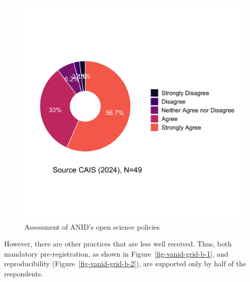 \documentclass[
  letterpaper,
  DIV=11,
  numbers=noendperiod]{scrartcl}
\begin{document}
\begin{figure}
\begin{minipage}[t]{0.50\linewidth}
{{\includegraphics{paper_files/figure-pdf/fig-vanid-grid-2.png}

}

}

\end{minipage}%

\caption{\label{fig-vanid-grid}Assessment of ANID's open science
policies}

\end{figure}

However, there are other practices that are less well received. Thus,
both mandatory pre-registration, as shown in
Figure~\ref{fig-vanid-grid-b-1}, and reproducibility
(Figure~\ref{fig-vanid-grid-b-2}), are supported only by half of the
respondents.
\end{document}
